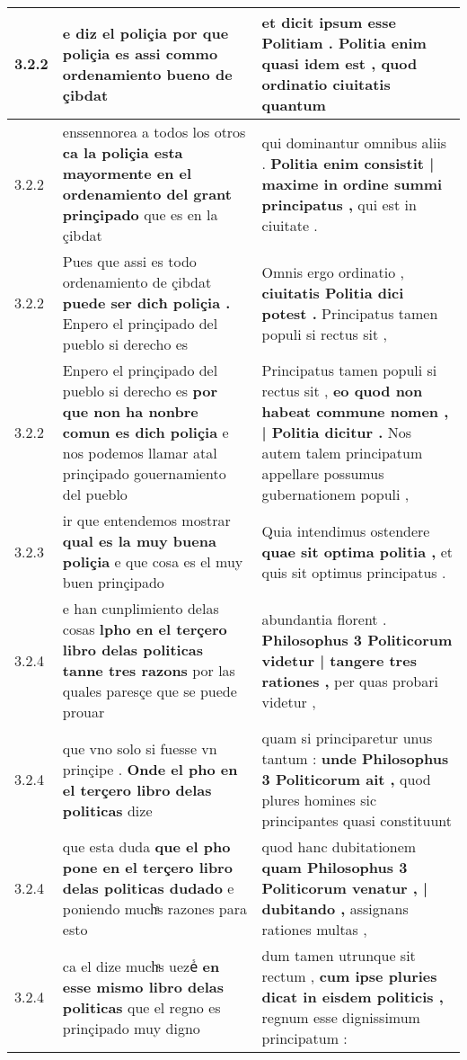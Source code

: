 \begin{tabular}{|p{1cm}|p{6.5cm}|p{6.5cm}|}
3.2.2 & e diz el poliçia \textbf{ por que poliçia es } assi commo ordenamiento bueno de çibdat & et dicit ipsum esse Politiam . \textbf{ Politia enim quasi idem est , } quod ordinatio ciuitatis quantum \\\hline
3.2.2 & enssennorea a todos los otros \textbf{ ca la poliçia esta mayormente en el ordenamiento del grant prinçipado } que es en la çibdat & qui dominantur omnibus aliis . \textbf{ Politia enim consistit | maxime in ordine summi principatus , } qui est in ciuitate . \\\hline
3.2.2 & Pues que assi es todo ordenamiento de çibdat \textbf{ puede ser dicħ poliçia . } Enpero el prinçipado del pueblo si derecho es & Omnis ergo ordinatio , \textbf{ ciuitatis Politia dici potest . } Principatus tamen populi si rectus sit , \\\hline
3.2.2 & Enpero el prinçipado del pueblo si derecho es \textbf{ por que non ha nonbre comun es dich poliçia } e nos podemos llamar atal prinçipado gouernamiento del pueblo & Principatus tamen populi si rectus sit , \textbf{ eo quod non habeat commune nomen , | Politia dicitur . } Nos autem talem principatum appellare possumus gubernationem populi , \\\hline
3.2.3 & ir que entendemos mostrar \textbf{ qual es la muy buena poliçia } e que cosa es el muy buen prinçipado & Quia intendimus ostendere \textbf{ quae sit optima politia , } et quis sit optimus principatus . \\\hline
3.2.4 & e han cunplimiento delas cosas \textbf{ lpho en el terçero libro delas politicas tanne tres razons } por las quales paresçe que se puede prouar & abundantia florent . \textbf{ Philosophus 3 Politicorum videtur | tangere tres rationes , } per quas probari videtur , \\\hline
3.2.4 & que vno solo si fuesse vn prinçipe . \textbf{ Onde el pho en el terçero libro delas politicas } dize & quam si principaretur unus tantum : \textbf{ unde Philosophus 3 Politicorum ait , } quod plures homines sic principantes quasi constituunt \\\hline
3.2.4 & que esta duda \textbf{ que el pho pone en el terçero libro delas politicas dudado } e poniendo muchͣs razones para esto & quod hanc dubitationem \textbf{ quam Philosophus 3 Politicorum venatur , | dubitando , } assignans rationes multas , \\\hline
3.2.4 & ca el dize muchͣs uezeᷤ \textbf{ en esse mismo libro delas politicas } que el regno es prinçipado muy digno & dum tamen utrunque sit rectum , \textbf{ cum ipse pluries dicat in eisdem politicis , } regnum esse dignissimum principatum : \\\hline

\end{tabular}

